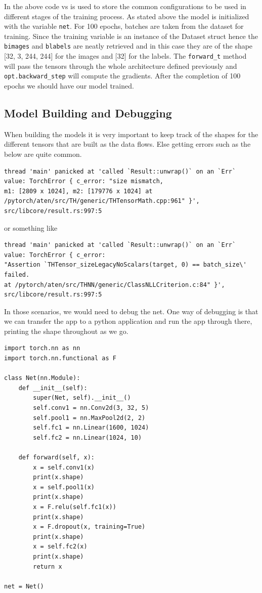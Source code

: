 \documentclass{book}
\begin{document}
In the above code vs is used to store the common configurations to be used in different stages of the training process. As stated above the model is initialized with the variable \lstinline{net}. For 100 epochs, batches are taken from the dataset for training. Since the training variable is an instance of the Dataset struct hence the \lstinline{bimages} and \lstinline{blabels} are neatly retrieved and in this case they are of the shape [32, 3, 244, 244] for the images and [32] for the labels. The \lstinline{forward_t} method will pass the tensors through the whole architecture defined previously and \lstinline{opt.backward_step} will compute the gradients. After the completion of 100 epochs we should have our model trained.

\subsection{Model Building and Debugging}%
When building the models it is very important to keep track of the shapes for the different tensors that are built as the data flows. Else getting errors such as the below are quite common.

\begin{lstlisting}[caption={}, basicstyle=\small]
thread 'main' panicked at 'called `Result::unwrap()` on an `Err`
value: TorchError { c_error: "size mismatch,
m1: [2809 x 1024], m2: [179776 x 1024] at
/pytorch/aten/src/TH/generic/THTensorMath.cpp:961" }',
src/libcore/result.rs:997:5
\end{lstlisting}

or something like

\begin{lstlisting}[caption={}, basicstyle=\small]
thread 'main' panicked at 'called `Result::unwrap()` on an `Err`
value: TorchError { c_error:
"Assertion `THTensor_sizeLegacyNoScalars(target, 0) == batch_size\' failed.
at /pytorch/aten/src/THNN/generic/ClassNLLCriterion.c:84" }',
src/libcore/result.rs:997:5
\end{lstlisting}

In those scenarios, we would need to debug the net. One way of debugging is that we can transfer the app to a python application and run the app through there, printing the shape throughout as we go.

\begin{lstlisting}[caption={ex code in pytorch}, basicstyle=\small]
import torch.nn as nn
import torch.nn.functional as F

class Net(nn.Module):
    def __init__(self):
        super(Net, self).__init__()
        self.conv1 = nn.Conv2d(3, 32, 5)
        self.pool1 = nn.MaxPool2d(2, 2)
        self.fc1 = nn.Linear(1600, 1024)
        self.fc2 = nn.Linear(1024, 10)

    def forward(self, x):
        x = self.conv1(x)
        print(x.shape)
        x = self.pool1(x)
        print(x.shape)
        x = F.relu(self.fc1(x))
        print(x.shape)
        x = F.dropout(x, training=True)
        print(x.shape)
        x = self.fc2(x)
        print(x.shape)
        return x

net = Net()
\end{lstlisting}
\end{document}
